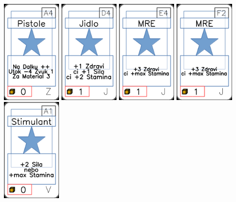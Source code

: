 \documentclass[a4paper]{article}
\begin{document}
	\includegraphics[width=3.0cm]{img-1_93}
	\includegraphics[width=3.0cm]{img-1_18}
	\includegraphics[width=3.0cm]{img-1_23}
	\includegraphics[width=3.0cm]{img-1_26}
	\includegraphics[width=3.0cm]{img-1_60}
\end{document}
